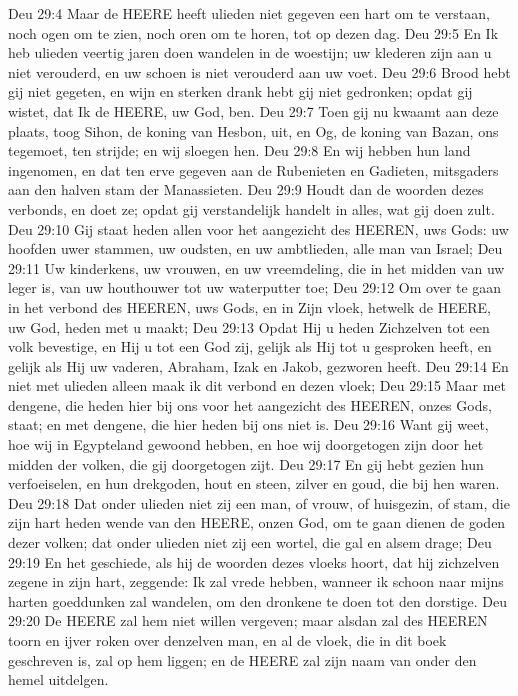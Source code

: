Deu 29:4  Maar de HEERE heeft ulieden niet gegeven een hart om te verstaan, noch ogen om te zien, noch oren om te horen, tot op dezen dag.
Deu 29:5  En Ik heb ulieden veertig jaren doen wandelen in de woestijn; uw klederen zijn aan u niet verouderd, en uw schoen is niet verouderd aan uw voet.
Deu 29:6  Brood hebt gij niet gegeten, en wijn en sterken drank hebt gij niet gedronken; opdat gij wistet, dat Ik de HEERE, uw God, ben.
Deu 29:7  Toen gij nu kwaamt aan deze plaats, toog Sihon, de koning van Hesbon, uit, en Og, de koning van Bazan, ons tegemoet, ten strijde; en wij sloegen hen.
Deu 29:8  En wij hebben hun land ingenomen, en dat ten erve gegeven aan de Rubenieten en Gadieten, mitsgaders aan den halven stam der Manassieten.
Deu 29:9  Houdt dan de woorden dezes verbonds, en doet ze; opdat gij verstandelijk handelt in alles, wat gij doen zult.
Deu 29:10  Gij staat heden allen voor het aangezicht des HEEREN, uws Gods: uw hoofden uwer stammen, uw oudsten, en uw ambtlieden, alle man van Israel;
Deu 29:11  Uw kinderkens, uw vrouwen, en uw vreemdeling, die in het midden van uw leger is, van uw houthouwer tot uw waterputter toe;
Deu 29:12  Om over te gaan in het verbond des HEEREN, uws Gods, en in Zijn vloek, hetwelk de HEERE, uw God, heden met u maakt;
Deu 29:13  Opdat Hij u heden Zichzelven tot een volk bevestige, en Hij u tot een God zij, gelijk als Hij tot u gesproken heeft, en gelijk als Hij uw vaderen, Abraham, Izak en Jakob, gezworen heeft.
Deu 29:14  En niet met ulieden alleen maak ik dit verbond en dezen vloek;
Deu 29:15  Maar met dengene, die heden hier bij ons voor het aangezicht des HEEREN, onzes Gods, staat; en met dengene, die hier heden bij ons niet is.
Deu 29:16  Want gij weet, hoe wij in Egypteland gewoond hebben, en hoe wij doorgetogen zijn door het midden der volken, die gij doorgetogen zijt.
Deu 29:17  En gij hebt gezien hun verfoeiselen, en hun drekgoden, hout en steen, zilver en goud, die bij hen waren.
Deu 29:18  Dat onder ulieden niet zij een man, of vrouw, of huisgezin, of stam, die zijn hart heden wende van den HEERE, onzen God, om te gaan dienen de goden dezer volken; dat onder ulieden niet zij een wortel, die gal en alsem drage;
Deu 29:19  En het geschiede, als hij de woorden dezes vloeks hoort, dat hij zichzelven zegene in zijn hart, zeggende: Ik zal vrede hebben, wanneer ik schoon naar mijns harten goeddunken zal wandelen, om den dronkene te doen tot den dorstige.
Deu 29:20  De HEERE zal hem niet willen vergeven; maar alsdan zal des HEEREN toorn en ijver roken over denzelven man, en al de vloek, die in dit boek geschreven is, zal op hem liggen; en de HEERE zal zijn naam van onder den hemel uitdelgen.
